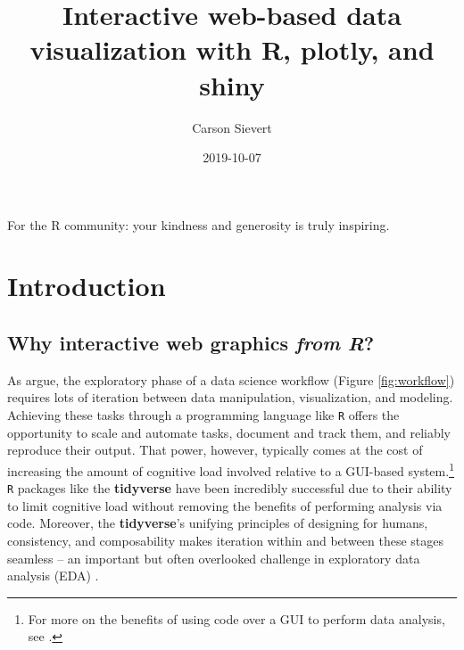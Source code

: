 \documentclass[
  12pt,
]{krantz}
\title{Interactive web-based data visualization with R, plotly, and shiny}
\author{Carson Sievert}
\date{2019-10-07}
\begin{document}
\maketitle

\thispagestyle{empty}
\begin{center}
For the R community: your kindness and generosity is truly inspiring.
\end{center}

\setlength{\abovedisplayskip}{-5pt}
\setlength{\abovedisplayshortskip}{-5pt}

{
\hypersetup{linkcolor=}
\setcounter{tocdepth}{2}
\tableofcontents
}
\mainmatter

\hypertarget{introduction}{%
\chapter{Introduction}\label{introduction}}

\hypertarget{why-interactive-web-graphics-from-r}{%
\section{\texorpdfstring{Why interactive web graphics \emph{from R}?}{Why interactive web graphics from R?}}\label{why-interactive-web-graphics-from-r}}

As \citet{r4ds} argue, the exploratory phase of a data science workflow (Figure \ref{fig:workflow}) requires lots of iteration between data manipulation, visualization, and modeling. Achieving these tasks through a programming language like \texttt{R} offers the opportunity to scale and automate tasks, document and track them, and reliably reproduce their output. That power, however, typically comes at the cost of increasing the amount of cognitive load involved relative to a GUI-based system.\footnote{For more on the benefits of using code over a GUI to perform data analysis, see \citet{data-science-gui}.} \texttt{R} packages like the \textbf{tidyverse} have been incredibly successful due to their ability to limit cognitive load without removing the benefits of performing analysis via code. Moreover, the \textbf{tidyverse}'s unifying principles of designing for humans, consistency, and composability makes iteration within and between these stages seamless -- an important but often overlooked challenge in exploratory data analysis (EDA) \citep{tidy-principles}.
\end{document}
